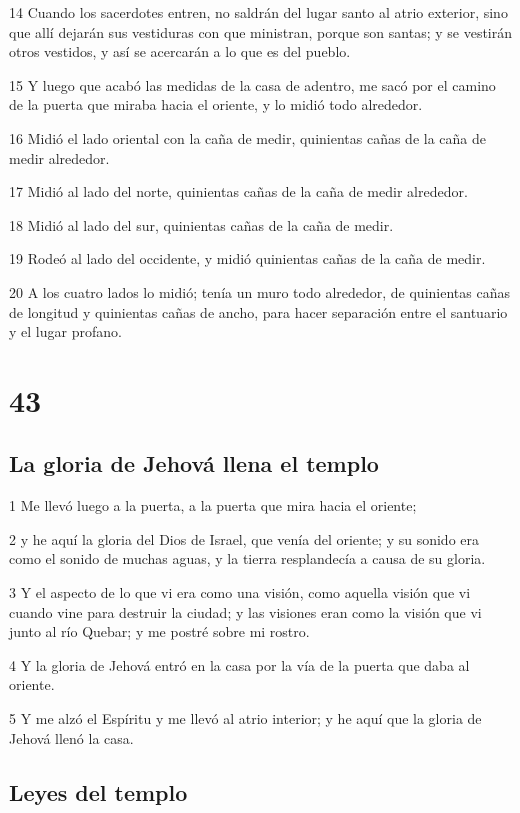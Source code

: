 \par 14 Cuando los sacerdotes entren, no saldrán del lugar santo al atrio exterior, sino que allí dejarán sus vestiduras con que ministran, porque son santas; y se vestirán otros vestidos, y así se acercarán a lo que es del pueblo.
\par 15 Y luego que acabó las medidas de la casa de adentro, me sacó por el camino de la puerta que miraba hacia el oriente, y lo midió todo alrededor.
\par 16 Midió el lado oriental con la caña de medir, quinientas cañas de la caña de medir alrededor.
\par 17 Midió al lado del norte, quinientas cañas de la caña de medir alrededor.
\par 18 Midió al lado del sur, quinientas cañas de la caña de medir.
\par 19 Rodeó al lado del occidente, y midió quinientas cañas de la caña de medir.
\par 20 A los cuatro lados lo midió; tenía un muro todo alrededor, de quinientas cañas de longitud y quinientas cañas de ancho, para hacer separación entre el santuario y el lugar profano. 

\chapter{43}

\section*{La gloria de Jehová llena el templo}

\par 1 Me llevó luego a la puerta, a la puerta que mira hacia el oriente;
\par 2 y he aquí la gloria del Dios de Israel, que venía del oriente; y su sonido era como el sonido de muchas aguas, y la tierra resplandecía a causa de su gloria.
\par 3 Y el aspecto de lo que vi era como una visión, como aquella visión que vi cuando vine para destruir la ciudad; y las visiones eran como la visión que vi junto al río Quebar; y me postré sobre mi rostro.
\par 4 Y la gloria de Jehová entró en la casa por la vía de la puerta que daba al oriente.
\par 5 Y me alzó el Espíritu y me llevó al atrio interior; y he aquí que la gloria de Jehová llenó la casa.

\section*{Leyes del templo}


